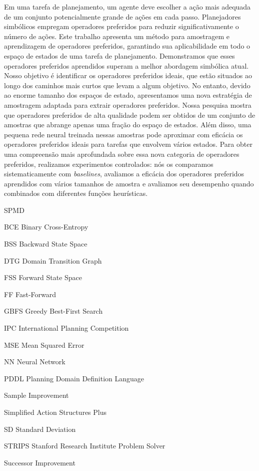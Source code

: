 \documentclass[ppgc,diss,english]{iiufrgs}
\begin{document}
\begin{translatedabstract}
Em uma tarefa de planejamento, um agente deve escolher a ação mais adequada de um conjunto potencialmente grande de ações em cada passo. Planejadores simbólicos empregam operadores preferidos para reduzir significativamente o número de ações. Este trabalho apresenta um método para amostragem e aprendizagem de operadores preferidos, garantindo sua aplicabilidade em todo o espaço de estados de uma tarefa de planejamento. Demonstramos que esses operadores preferidos aprendidos superam a melhor abordagem simbólica atual.
Nosso objetivo é identificar os operadores preferidos ideais, que estão situados ao longo dos caminhos mais curtos que levam a algum objetivo. No entanto, devido ao enorme tamanho dos espaços de estado, apresentamos uma nova estratégia de amostragem adaptada para extrair operadores preferidos. Nossa pesquisa mostra que operadores preferidos de alta qualidade podem ser obtidos de um conjunto de amostras que abrange apenas uma fração do espaço de estados. Além disso, uma pequena rede neural treinada nessas amostras pode aproximar com eficácia os operadores preferidos ideais para tarefas que envolvem vários estados.
Para obter uma compreensão mais aprofundada sobre essa nova categoria de operadores preferidos, realizamos experimentos controlados: nós os comparamos sistematicamente com \textit{baselines}, avaliamos a eficácia dos operadores preferidos aprendidos com vários tamanhos de amostra e avaliamos seu desempenho quando combinados com diferentes funções heurísticas.
\end{translatedabstract}

\begin{listofabbrv}{SPMD}
        \item[BCE] Binary Cross-Entropy
        \item[BSS] Backward State Space
        \item[DTG] Domain Transition Graph
        \item[FSS] Forward State Space
        \item[FF] Fast-Forward
        \item[GBFS] Greedy Best-First Search
        \item[IPC] International Planning Competition
        \item[MSE] Mean Squared Error
        \item[NN]  Neural Network
        \item[PDDL] Planning Domain Definition Language
        \item[\sai] Sample Improvement
        \item[\sas] Simplified Action Structures Plus
        \item[SD] Standard Deviation
        \item[STRIPS] Stanford Research Institute Problem Solver
        \item[\sui] Successor Improvement
\end{listofabbrv}
\end{document}
